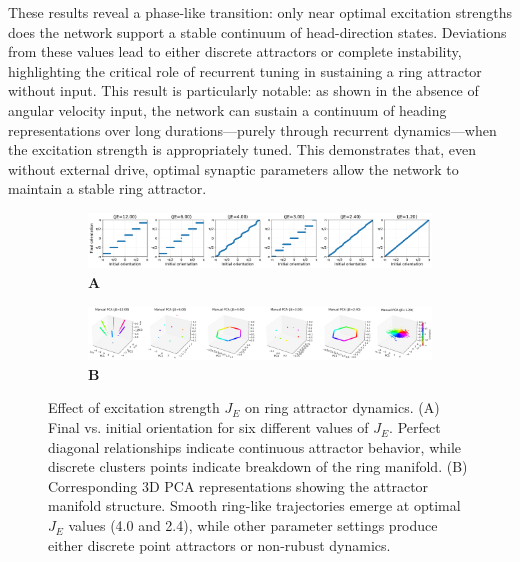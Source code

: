 \documentclass[11pt,a4paper]{article}
\begin{document}
These results reveal a phase-like transition: only near optimal excitation strengths does the network support a stable continuum of head-direction states. Deviations from these values lead to either discrete attractors or complete instability, highlighting the critical role of recurrent tuning in sustaining a ring attractor without input.  
This result is particularly notable: as shown in the absence of angular velocity input, the network can sustain a continuum of heading representations over long durations—purely through recurrent dynamics—when the excitation strength is appropriately tuned. This demonstrates that, even without external drive, optimal synaptic parameters allow the network to maintain a stable ring attractor.

\begin{figure}[H]
\centering
\begin{subfigure}{\textwidth}
    \centering
    \caption*{\textbf{A}}
    \includegraphics[width=\textwidth]{orientation_comparison_without_v.png}
\end{subfigure}

\vspace{0.1cm}

\begin{subfigure}{\textwidth}
    \centering
    \caption*{\textbf{B}}
    \includegraphics[width=1.1\textwidth]{manual_pca_without_v.png}
\end{subfigure}

\caption{Effect of excitation strength \( J_E \) on ring attractor dynamics. (A) Final vs. initial orientation for six different values of \( J_E \). Perfect diagonal relationships indicate continuous attractor behavior, while discrete clusters points indicate breakdown of the ring manifold. 
(B) Corresponding 3D PCA representations showing the attractor manifold structure. Smooth ring-like trajectories emerge at optimal \( J_E \) values (4.0 and 2.4), while other parameter settings produce either discrete point attractors or non-rubust dynamics.}
\label{fig:je_parameter_sweep}
\end{figure}
\end{document}

